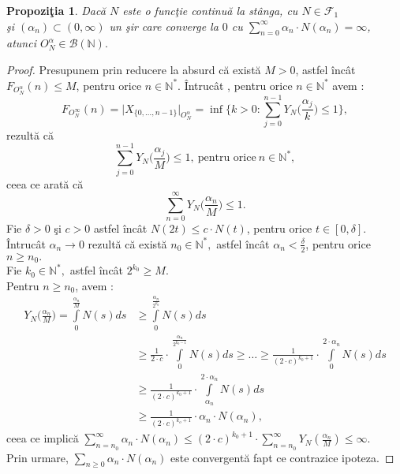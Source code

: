 \documentclass[ a4paper, 12pt]{report}
\newtheorem{prop}[theorem]{\bf Propozi\c tia }
\theoremstyle{definition}
\theoremstyle{remark}
\numberwithin{equation}{section}
\begin{document}
\begin{prop}
Dac\u a $N$ este o func\c tie continu\u a la st\^anga, cu $N \in \mathcal{F}_{1}$ \\\c si $(\alpha_n) \subset (0,\infty)$ un \c sir care converge la $0$ cu $\sum\limits_{n=0}^{\infty} \alpha_n \cdot N(\alpha_n) = \infty$,
 atunci $O_N^{\alpha} \in \mathcal{B}(\mathbb{N}).$  
\end{prop}
\begin{proof}
Presupunem prin reducere la absurd c\u a exist\u a $M > 0$, astfel \^inc\^at $F_{O_{N}^{\alpha}}(n) \leq M$, pentru orice $n \in \mathbb{N}^{\ast}$. \^Intruc\^at , pentru orice $n \in \mathbb{N}^{\ast}$ avem : \[F_{O_{N}^{\infty}}(n) = \lvert X_{\{0,\ldots,n-1 \}} \rvert_{O_{N}^{\alpha}} = \inf\Big\{ k>0 : \sum\limits_{j=0}^{n-1} Y_N \Big(\frac{\alpha_j}{k}\Big) \leq 1\Big\},\] rezult\u a c\u a \[\sum\limits_{j=0}^{n-1} Y_N\Big(\frac{\alpha_j}{M}\Big) \leq 1,\ \mbox{pentru orice}\  n \in \mathbb{N}^{\ast},\] ceea ce arat\u a c\u a \[\sum\limits_{n=0}^{\infty}Y_N\Big(\frac{\alpha_n}{M}\Big) \leq 1.\]
Fie $\delta>0$ \c si $c > 0$ astfel \^inc\^at $N(2t) \leq c \cdot N(t)$, pentru orice $t \in [0,\delta]$. \^Intruc\^at $\alpha_n \longrightarrow 0$  rezult\u a c\u a exist\u a $n_0 \in \mathbb{N}^{\ast},$ astfel \^inc\^at $\alpha_n < \frac{\delta}{2}$, pentru orice $n \geq n_0.$\\
Fie $k_0 \in \mathbb{N}^{\ast},$ astfel \^inc\^at $2^{k_{0}} \geq M.$ \\
Pentru $n \geq n_0$, avem :
\begin{align*}
Y_N\Big(\frac{\alpha_n}{M}\Big) = \int\limits_0^{\frac{\alpha_n}{M}} N(s)ds&\geq\int\limits_0^{\frac{\alpha_n}{2^{k_{0}}}} N(s) ds\\
 &\geq \frac{1}{2 \cdot c}\cdot \int\limits_{0}^{\frac{\alpha_n}{2^{k_{0}-1}}} N(s)ds\geq \ldots \geq \frac{1}{(2 \cdot c)^{k_{0}+1}} \cdot \int\limits_{0}^{2 \cdot \alpha_n} N(s)ds\\
   &\geq \frac{1}{(2 \cdot c)^{k_{0}+1}} \cdot \int\limits_{\alpha_n}^{2 \cdot \alpha_n}N(s)ds\\
   &\geq \frac{1}{(2 \cdot c)^{k_{o}+1}} \cdot \alpha_n \cdot N(\alpha_n),
\end{align*} ceea ce implic\u a  $\sum\limits_{n=n_0}^{\infty} \alpha_n \cdot N(\alpha_n) \leq (2 \cdot c)^{k_{0}+1} \cdot \sum\limits_{n=n_0}^{\infty} Y_N(\frac{\alpha_n}{M}) \leq \infty.$\\
Prin urmare, $\sum\limits_{n \geq 0} \alpha_n \cdot N(\alpha_n)$ este convergent\u a  fapt ce contrazice ipoteza. 
\end{proof}
\end{document}
